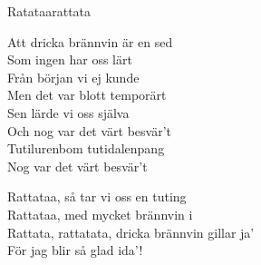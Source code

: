 \begin{song}{Ratataa}{rattata}
\begin{vers}
Att dricka brännvin är en sed\\
Som ingen har oss lärt\\
Från början vi ej kunde\\
Men det var blott temporärt\\
Sen lärde vi oss själva\\
Och nog var det värt besvär't\\
Tutilurenbom tutidalenpang\\
Nog var det värt besvär't\\
\end{vers}
\begin{vers}
\repopen Rattataa, så tar vi oss en tuting\\
Rattataa, med mycket brännvin i\\
Rattata, rattatata, dricka brännvin gillar ja'\\
För jag blir så glad ida'! \repclose\\
\end{vers}
\end{song}
